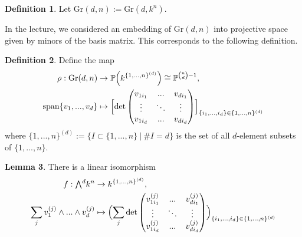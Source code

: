 \documentclass{scrartcl}
\newcommand{\Proj}{\mathbb{P}}
\newcommand{\Gr}{\mathrm{Gr}}
\newcommand{\extpow}{\mathchoice{{\textstyle\bigwedge}}
    {{\bigwedge}}
    {{\textstyle\wedge}}
    {{\scriptstyle\wedge}}}
\newcommand{\vspan}{\mathrm{span}}
\theoremstyle{definition}
\newtheorem{definition}{Definition}
\newtheorem{lemma}[definition]{Lemma}
\begin{document}
\begin{definition}
    Let $\Gr(d, n) := \Gr(d, k^n)$.
\end{definition}
In the lecture, we considered an embedding of $\Gr(d, n)$ into projective space given by minors of the basis matrix.
This corresponds to the following definition.
\begin{definition}
    Define the map
    \begin{align*}
        \rho: \Gr(d, n) &\to \Proj\Bigl(k^{\{1, ..., n\}^{(d)}}\Bigr) \cong \Proj^{{n \choose d} - 1}, \\
        \vspan\{v_1, ..., v_d\} &\mapsto \Bigl[ \det\left(\begin{matrix}
            v_{1i_1} & ... & v_{di_1} \\
            \vdots & \ddots & \vdots \\
            v_{1i_d} & ... & v_{di_d}
        \end{matrix}\right) \Bigr]_{\{i_1, ..., i_d\} \in \{1, ..., n\}^{(d)}}
    \end{align*}
    where $\{1, ..., n\}^{(d)} := \{ I \subset \{1, ..., n\} \ | \ \#I = d \}$ is the set of all $d$-element subsets of $\{1, ..., n\}$.
\end{definition}
\begin{lemma}
    \label{prop:isomorphism_extpow_det}
    There is a linear isomorphism
    \begin{align*}
        f: \extpow^d k^n &\to k^{\{1, ..., n\}^{(d)}}, \\
        \sum_j v_1^{(j)} \wedge ... \wedge v_d^{(j)} &\mapsto \Bigl( \sum_j \det\left(\begin{matrix}
            v_{1i_1}^{(j)} & ... & v_{di_1}^{(j)} \\
            \vdots & \ddots & \vdots \\
            v_{1i_d}^{(j)} & ... & v_{di_d}^{(j)}
        \end{matrix}\right) \Bigr)_{\{i_1, ..., i_d\} \in \{1, ..., n\}^{(d)}}
    \end{align*}
\end{lemma}
\end{document}
